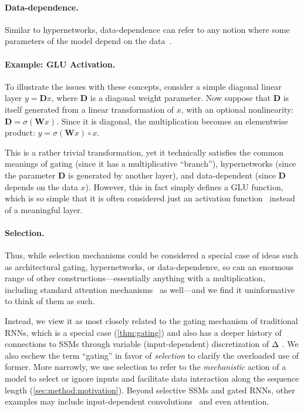 \paragraph{Data-dependence.}
Similar to hypernetworks, data-dependence can refer to any notion where some parameters of the model depend on the data~\citep{poli2023hyena}.

\paragraph{Example: GLU Activation.}
To illustrate the issues with these concepts, consider a simple diagonal linear layer $y = \bm{D}x$, where $\bm{D}$ is a diagonal weight parameter.
Now suppose that $\bm{D}$ is itself generated from a linear transformation of $x$, with an optional nonlinearity: $\bm{D} = \sigma(\bm{W} x)$.
Since it is diagonal, the multiplication becomes an elementwise product: $y = \sigma(\bm{W} x) \circ x$.

This is a rather trivial transformation, yet it technically satisfies the common meanings of gating (since it has a multiplicative ``branch''),
hypernetworks (since the parameter $\bm{D}$ is generated by another layer), and data-dependent (since $\bm{D}$ depends on the data $x$).
However, this in fact simply defines a GLU function,
which is so simple that it is often considered just an activation function~\citep{dauphin2017language,shazeer2020glu}
instead of a meaningful layer.

\paragraph{Selection.}
Thus, while selection mechanisms could be considered a special case of ideas such as architectural gating, hypernetworks, or data-dependence, so can an enormous range of other constructions---essentially anything with a multiplication, including standard attention mechanisms~\citep{bahdanau2015neural,vaswani2017attention} as well---and we find it uninformative to think of them as such.

Instead, we view it as most closely related to the gating mechanism of traditional RNNs,
which is a special case (\cref{thm:gating}) and also has a deeper history of connections to SSMs through variable (input-dependent) discretization of $\Delta$ \citep{funahashi1993approximation,tallec2018can,gu2020hippo}.
We also eschew the term ``gating'' in favor of \emph{selection} to clarify the overloaded use of former.
More narrowly, we use selection to refer to the \emph{mechanistic} action of a model to select or ignore inputs and facilitate data interaction along the sequence length (\cref{sec:method:motivation}).
Beyond selective SSMs and gated RNNs, other examples may include input-dependent convolutions~\citep{yang2019condconv,lioutas2020time,kosma2023time,lutati2023focus} and even attention.




